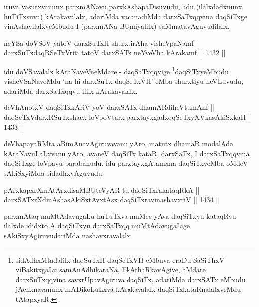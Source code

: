 \begin{artha}
iruva vasutxvanunx parxmANavu parxkAshapaDisuvudu, adu (ilalxdadxnunx huTiTxsuva) kArakavalalx, adariMda vacanadiMda darxSaTxqqvina daqSiTxge vinAshavilalxveMbudu I (parxmANa BUmiyalilx) saMmatavAguvudilalx.
\end{artha}


\begin{shl}
neYSa doVSoV yatoV darxSuTxH shurxtirAha visheVpaNamf ||  \\
darxSuTxdaqRSeTxVriti tatoV darxSATx neYveVha kArakamf ||  1432 ||  
\end{shl}

\begin{artha}
idu doVSavalalx kAraNaveVneMdare - daqSaTxqqvige \footnote{sidAdhxMtadalilx daqSuTxH daqSeTxVH eMbuva eraDu SaSiThxV viBakitxgaLu samAnAdhikaraNa, EkAthaRkavAgive, aMdare darxSuTxqqvina savxrUpavAgiruva daqSiTx, adariMda darxSATx eMbudu jAcnxnavanunx mADikoLuLxva kArakavalalx daqSiTxkataRnalalxveMdu tAtapxyaR.}daqSiTxyeMbudu visheVSaNaveMdu `na hi darxSuTx daqSeTxVH' eMba shurxtiyu heVLuvudu, adariMda darxSaTxqqvu ililx kArakavalalx.
\end{artha}


\begin{shl}
deVhAnotxV daqSiTxkAriV yoV darxSATx dhamARdiheVtumAnf || \\
daqSeTxVdarxRSuTxshacx loVpoV\s tarx parxtayxgadxqqSeTxyXVkasAkiSxkaH ||  1433 ||  
\end{shl}

\begin{artha}
deVhapayaRMta aBimAnavAgiruvavanu yAro, matutx dhamaR modalAda kAraNavuLaLxvanu yAro, avaneV daqSiTx kataR, darxSaTx, I darxSaTxqqvina daqSiTxge loVpavu barabahudu. idu parxtayxgAtamxna daqSiTxyeMba oMdeV sAkiSxyiMda sidadhxvAguvudu.
\end{artha}


\begin{shl}
pArxkapxrXmAtArxdisaMBUteVyAR tu daqSiTxrakataqRkA || \\
darxSATxrXdinAshasAkiSxtAvxtAsx daqSiTxravinashavxriV ||  1434 || 
\end{shl}

\begin{artha}
parxmAtaq muMtAdavugaLu huTuTxva muMce yAva daqSiTxyu kataqRvu ilalxde ididxto A daqSiTxyu darxSaTxqq muMtAdavugaLige sAkiSxyAgiruvudariMda nashavxravalalx.
\end{artha}

